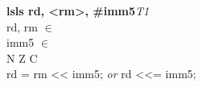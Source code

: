 


\begin{instructionblock}{\imagewidth}%
    \textbf{lsls rd, <rm>, \#imm5}\hfill\textit{T1}\\
    rd, rm $\in$ \baseregisters\\
    imm5 $\in$ \immFive\\
    {N Z C}\\
    rd = rm {<}{<} imm5; \textit{or} rd {<}{<}= imm5;
\end{instructionblock}

